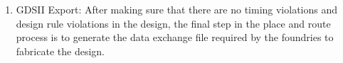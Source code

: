 \documentclass[a4paper,11pt]{article}%
\begin{document}
\begin{enumerate}[1.)]
	\item GDSII Export: After making sure that there are no timing violations and design rule violations in the design, the final step in the place and route process is to generate the data exchange file required by the foundries to fabricate the design.
	
\end{enumerate} 

\pagebreak
{\small


}
\end{document}
